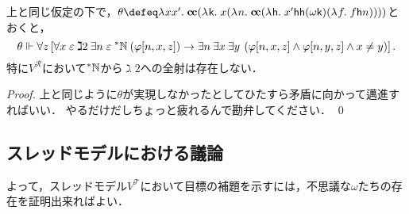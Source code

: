 \documentclass[realisability.tex]{subfiles}
\begin{document}
\begin{lemma}
 上と同じ仮定の下で，$\theta \defeq \abs{x x'}{\cc(\abs{\conti}{x(\abs{n}{\cc(\abs{\mathsf{h}}{x'\mathsf{h}\mathsf{h}(\omega \conti)(\abs{f}{f\mathsf{h}n})})})})}$とおくと，
 \[
 \theta \Vdash \forall z \left[ \forall x \mathrel{\varepsilon} \gimel 2 \: \exists n \mathrel{\varepsilon} \mathord{{}^{*}\mathbb{N}} \: ( \varphi[n, x, z]) \to \exists n\: \exists x\: \exists y\: \left(\varphi[n, x, z] \land  \varphi[n, y, z] \land x \neq y\right)  \right].
 \]
 特に$V^{\mathcal{R}}$において$\mathord{{}^{*}\mathbb{N}}$から$\gimel 2$への全射は存在しない．
\end{lemma}
\begin{proof}
 上と同じように$\theta$が実現しなかったとしてひたすら矛盾に向かって邁進すればいい．
 やるだけだしちょっと疲れるんで勘弁してください． \qed
\end{proof}


\subsection{スレッドモデルにおける議論}
よって，スレッドモデル$V^{\mathcal{T}}$において目標の補題を示すには，不思議な$\omega$たちの存在を証明出来ればよい．
\end{document}
